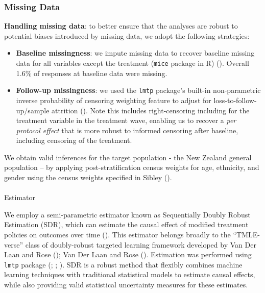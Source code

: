 \documentclass[
  singlecolumn]{article}
\makeatletter
\let\oldparagraph\paragraph
\renewcommand{\paragraph}{
    \@ifstar
      \xxxParagraphStar
      \xxxParagraphNoStar
  }
\newcommand{\xxxParagraphStar}[1]{\oldparagraph*{#1}\mbox{}}
\newcommand{\xxxParagraphNoStar}[1]{\oldparagraph{#1}\mbox{}}
\makeatother
\begin{document}
\subsubsection{Missing Data}\label{missing-data}

\textbf{Handling missing data}: to better ensure that the analyses are
robust to potential biases introduced by missing data, we adopt the
following strategies:

\begin{itemize}
\item
  \textbf{Baseline missingness}: we impute missing data to recover
  baseline missing data for all variables except the treatment
  (\texttt{mice} package in R) (). Overall 1.6\% of responses at baseline data were missing.
\item
  \textbf{Follow-up missingness}: we used the \texttt{lmtp} package's
  built-in non-parametric inverse probability of censoring weighting
  feature to adjust for loss-to-follow-up/sample attrition
  (). Note this
  includes right-censoring including for the treatment variable in the
  treatment wave, enabling us to recover a \emph{per protocol effect}
  that is more robust to informed censoring after baseline, including
  censoring of the treatment.
\end{itemize}

We obtain valid inferences for the target population - the New Zealand
general population -- by applying post-stratification census weights for
age, ethnicity, and gender using the census weights specified in Sibley
().

\paragraph{Estimator}\label{estimator}

We employ a semi-parametric estimator known as Sequentially Doubly
Robust Estimation (SDR), which can estimate the causal effect of
modified treatment policies on outcomes over time
(). This estimator
belongs broadly to the ``TMLE-verse'' class of doubly-robust targeted
learning framework developed by Van Der Laan and Rose
(); Van Der Laan and Rose
(). Estimation was performed using
\texttt{lmtp} package (; ;
). SDR is a robust
method that flexibly combines machine learning techniques with
traditional statistical models to estimate causal effects, while also
providing valid statistical uncertainty measures for these estimates.
\end{document}
